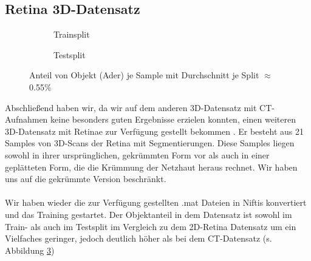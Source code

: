 \subsection{Retina 3D-Datensatz}
\begin{figure}[H]
\begin{minipage}{.5\textwidth}
\begin{subfigure}{\textwidth}

\caption{Trainsplit}
\label{pic:Haeuf-Train_108}
\end{subfigure}
\end{minipage}
\begin{minipage}{.5\textwidth}
\begin{subfigure}{\textwidth}

\caption{Testsplit}
\label{pic:Haeuf-Test_108}
\end{subfigure}
\end{minipage}
\caption{Anteil von Objekt (Ader) je Sample mit Durchschnitt je Split $\approx$ 0.55\%}
\label{pic:Haeuf_108}
\end{figure}
Abschließend haben wir, da wir auf dem anderen 3D-Datensatz mit CT-Aufnahmen keine besonders guten Ergebnisse erzielen konnten, einen weiteren 3D-Datensatz mit Retinae zur Verfügung gestellt bekommen \cite{retina3dDatensatz}. Er besteht aus 21 Samples von 3D-Scans der Retina mit Segmentierungen. Diese Samples liegen sowohl in ihrer ursprünglichen, gekrümmten Form vor als auch in einer geplätteten Form, die die Krümmung der Netzhaut heraus rechnet. Wir haben uns auf die gekrümmte Version beschränkt.\\\\
Wir haben wieder die zur Verfügung gestellten .mat Dateien in Niftis konvertiert \cite{autoMLGithub} und das Training gestartet. Der Objektanteil in dem Datensatz ist sowohl im Train- als auch im Testsplit im Vergleich zu dem 2D-Retina Datensatz \cite{retina2d} um ein Vielfaches geringer, jedoch deutlich höher als bei dem CT-Datensatz (s. Abbildung \ref{pic:Haeuf_108})
